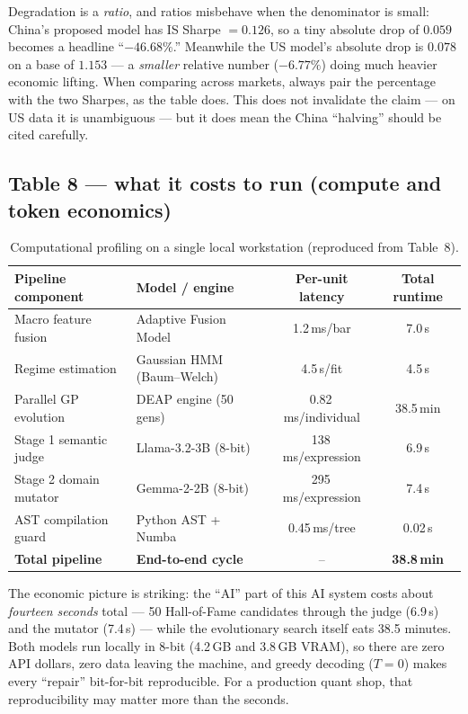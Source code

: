 \documentclass[11pt,a4paper]{article}
\begin{document}
\begin{scrutiny}
Degradation is a \emph{ratio}, and ratios misbehave when the denominator is
small: China's proposed model has IS Sharpe $=0.126$, so a tiny absolute drop
of $0.059$ becomes a headline ``$-46.68\%$.'' Meanwhile the US model's
absolute drop is $0.078$ on a base of $1.153$ --- a \emph{smaller} relative
number ($-6.77\%$) doing much heavier economic lifting. When comparing across
markets, always pair the percentage with the two Sharpes, as the table does.
This does not invalidate the claim --- on US data it is unambiguous ---
but it does mean the China ``halving'' should be cited carefully.
\end{scrutiny}

\subsection{Table 8 --- what it costs to run (compute and token economics)}

\begin{table}[H]
\centering\small
\caption{Computational profiling on a single local workstation
(reproduced from Table~8).}
\label{tab:compute}
\begin{tabular}{@{}llcc@{}}
\toprule
\textbf{Pipeline component} & \textbf{Model / engine} &
\textbf{Per-unit latency} & \textbf{Total runtime} \\
\midrule
Macro feature fusion    & Adaptive Fusion Model        & 1.2\,ms/bar          & 7.0\,s \\
Regime estimation       & Gaussian HMM (Baum--Welch)   & 4.5\,s/fit           & 4.5\,s \\
Parallel GP evolution   & DEAP engine (50 gens)        & 0.82\,ms/individual  & 38.5\,min \\
Stage 1 semantic judge  & Llama-3.2-3B (8-bit)         & 138\,ms/expression   & 6.9\,s \\
Stage 2 domain mutator  & Gemma-2-2B (8-bit)           & 295\,ms/expression   & 7.4\,s \\
AST compilation guard   & Python AST + Numba           & 0.45\,ms/tree        & 0.02\,s \\
\midrule
\textbf{Total pipeline} & \textbf{End-to-end cycle}    & --                   & \textbf{38.8\,min} \\
\bottomrule
\end{tabular}
\end{table}

\begin{plaineng}
The economic picture is striking: the ``AI'' part of this AI system costs
about \emph{fourteen seconds} total --- 50 Hall-of-Fame candidates through the
judge (6.9\,s) and the mutator (7.4\,s) --- while the evolutionary search
itself eats 38.5 minutes. Both models run locally in 8-bit (4.2\,GB and
3.8\,GB VRAM), so there are zero API dollars, zero data leaving the machine,
and greedy decoding ($T=0$) makes every ``repair'' bit-for-bit reproducible.
For a production quant shop, that reproducibility may matter more than the
seconds.
\end{plaineng}
\end{document}
